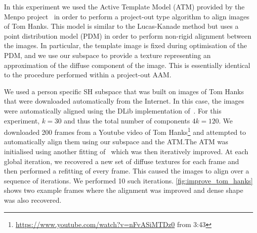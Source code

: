 In this experiment we used the Active Template Model (ATM) provided by the Menpo
project~\cite{menpo14} in order to perform a project-out type algorithm to align
images of Tom Hanks. This model is similar to the Lucas-Kanade
\cite{RefWorks:71} method but uses a point distribution model (PDM) in order to
perform non-rigid alignment between the images. In particular, the template
image is fixed during optimisation of the PDM, and we use our subspace to
provide a texture representing an approximation of the diffuse component of the
image. This is essentially identical to the procedure performed within a
project-out AAM.\@

We used a person specific SH subspace that was built on images of Tom Hanks that
were downloaded automatically from the Internet. In this case, the images were
automatically aligned using the DLib implementation of~\cite{Kazemi:he}. For
this experiment, $k = 30$ and thus the total number of components $4k = 120$. We
downloaded 200 frames from a Youtube video of Tom
Hanks\footnote{\url{https://www.youtube.com/watch?v=nFvASiMTDz0} from 3:43} and
attempted to automatically align them using our subspace and the ATM.\@ The ATM
was initialised using another fitting of~\cite{Kazemi:he} which was then
iteratively improved. At each global iteration, we recovered a new set of
diffuse textures for each frame and then performed a refitting of every frame.
This caused the images to align over a sequence of iterations. We performed 10
such iterations. \cref{fig:improve_tom_hanks} shows two example frames
where the alignment was improved and dense shape was also recovered.